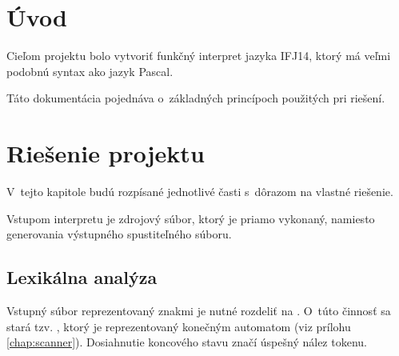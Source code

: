 \documentclass[12pt,a4paper,titlepage,final]{article}
\begin{document}

\def\author{TODO}
\def\email{xloginXX@stud.fit.vutbr.cz}
\def\projname{Interpret jazyka IFJ14}



\pagestyle{plain}
\setcounter{page}{1}
\tableofcontents

\listoftodos[Notes]

\newpage
\pagestyle{plain}
\setcounter{page}{1}

\section{Úvod} \label{uvod}

Cieľom projektu bolo vytvoriť funkčný interpret jazyka IFJ14, ktorý má veľmi
 podobnú syntax ako jazyk Pascal.

Táto dokumentácia pojednáva o~základných princípoch použitých pri riešení.


\section{Riešenie projektu} \label{riesenie}
V~tejto kapitole budú rozpísané jednotlivé časti s~dôrazom na vlastné riešenie.

Vstupom interpretu je zdrojový súbor, ktorý je priamo vykonaný, namiesto
generovania výstupného spustiteľného súboru.
\subsection{Lexikálna analýza}
Vstupný súbor reprezentovaný znakmi je nutné rozdeliť na .
O~túto činnosť sa stará tzv. , ktorý je reprezentovaný konečným
automatom (viz prílohu \ref{chap:scanner}). Dosiahnutie koncového stavu
značí úspešný nález tokenu.
\end{document}
